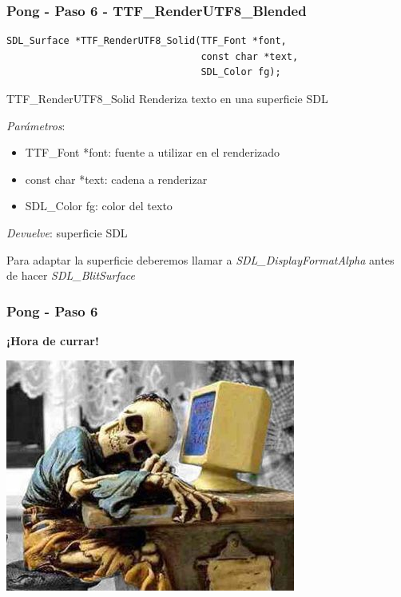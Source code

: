 \begin{frame}[fragile]
    \frametitle{Pong - Paso 6 - TTF\_RenderUTF8\_Blended}
	
\begin{verbatim}
SDL_Surface *TTF_RenderUTF8_Solid(TTF_Font *font,
                                  const char *text,
                                  SDL_Color fg);
\end{verbatim}

    \begin{block}{TTF\_RenderUTF8\_Solid}
	Renderiza texto en una superficie SDL
	
	\emph{Parámetros}:
	\begin{itemize}
	    \item TTF\_Font *font: fuente a utilizar en el renderizado
	    \item const char *text: cadena a renderizar
	    \item SDL\_Color fg: color del texto
	\end{itemize}
	
	\emph{Devuelve}: superficie SDL

    \end{block}
    
    Para adaptar la superficie deberemos llamar a \emph{SDL\_DisplayFormatAlpha}
    antes de hacer \emph{SDL\_BlitSurface}

\end{frame}

\begin{frame}
	\frametitle{Pong - Paso 6}
	
    \begin{center}
        \textbf{¡Hora de currar!}
    \end{center}
	
    \begin{center}
		\includegraphics[scale=0.7]{img/currar-3.jpg}
	\end{center}	

\end{frame}

